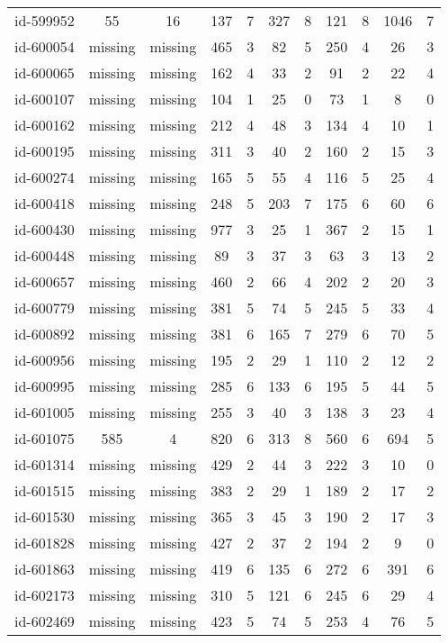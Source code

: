 \begin{tabular}{ccccccccccc}
id-599952 & 55 & 16 & 137 & 7 & 327 & 8 & 121 & 8 & 1046 & 7\\
id-600054 & missing & missing & 465 & 3 & 82 & 5 & 250 & 4 & 26 & 3\\
id-600065 & missing & missing & 162 & 4 & 33 & 2 & 91 & 2 & 22 & 4\\
id-600107 & missing & missing & 104 & 1 & 25 & 0 & 73 & 1 & 8 & 0\\
id-600162 & missing & missing & 212 & 4 & 48 & 3 & 134 & 4 & 10 & 1\\
id-600195 & missing & missing & 311 & 3 & 40 & 2 & 160 & 2 & 15 & 3\\
id-600274 & missing & missing & 165 & 5 & 55 & 4 & 116 & 5 & 25 & 4\\
id-600418 & missing & missing & 248 & 5 & 203 & 7 & 175 & 6 & 60 & 6\\
id-600430 & missing & missing & 977 & 3 & 25 & 1 & 367 & 2 & 15 & 1\\
id-600448 & missing & missing & 89 & 3 & 37 & 3 & 63 & 3 & 13 & 2\\
id-600657 & missing & missing & 460 & 2 & 66 & 4 & 202 & 2 & 20 & 3\\
id-600779 & missing & missing & 381 & 5 & 74 & 5 & 245 & 5 & 33 & 4\\
id-600892 & missing & missing & 381 & 6 & 165 & 7 & 279 & 6 & 70 & 5\\
id-600956 & missing & missing & 195 & 2 & 29 & 1 & 110 & 2 & 12 & 2\\
id-600995 & missing & missing & 285 & 6 & 133 & 6 & 195 & 5 & 44 & 5\\
id-601005 & missing & missing & 255 & 3 & 40 & 3 & 138 & 3 & 23 & 4\\
id-601075 & 585 & 4 & 820 & 6 & 313 & 8 & 560 & 6 & 694 & 5\\
id-601314 & missing & missing & 429 & 2 & 44 & 3 & 222 & 3 & 10 & 0\\
id-601515 & missing & missing & 383 & 2 & 29 & 1 & 189 & 2 & 17 & 2\\
id-601530 & missing & missing & 365 & 3 & 45 & 3 & 190 & 2 & 17 & 3\\
id-601828 & missing & missing & 427 & 2 & 37 & 2 & 194 & 2 & 9 & 0\\
id-601863 & missing & missing & 419 & 6 & 135 & 6 & 272 & 6 & 391 & 6\\
id-602173 & missing & missing & 310 & 5 & 121 & 6 & 245 & 6 & 29 & 4\\
id-602469 & missing & missing & 423 & 5 & 74 & 5 & 253 & 4 & 76 & 5\\

\end{tabular}
